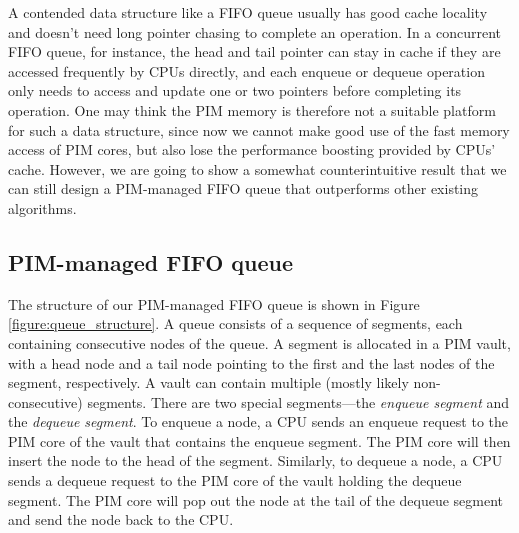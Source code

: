 \documentclass[11pt]{article}
\begin{document}
A contended data structure like a FIFO queue usually has good cache locality
and doesn't need long pointer chasing to complete an operation.
In a concurrent FIFO queue, for instance, the head and tail pointer can stay in
cache if they are accessed frequently by CPUs directly, and each enqueue or dequeue
operation only needs to access and update one or two pointers before completing its operation.
One may think the PIM memory is therefore not a suitable platform for such a data structure,
since now we cannot make good use of the fast memory access of PIM cores, but also
lose the performance boosting provided by CPUs' cache.
However, we are going to show a somewhat counterintuitive result that we can still design
a PIM-managed FIFO queue that outperforms other existing algorithms.

\subsection{PIM-managed FIFO queue}
The structure of our PIM-managed FIFO queue is shown in Figure \ref{figure:queue_structure}.
A queue consists of a sequence of segments, each containing consecutive nodes of the queue.
A segment is allocated in a PIM vault, with a head node and a tail node pointing to the first 
and the last nodes of the segment, respectively.
A vault can contain multiple (mostly likely non-consecutive) segments. 
There are two special segments---the \emph{enqueue segment} and the \emph{dequeue segment}.
To enqueue a node, a CPU sends an enqueue request to the PIM core of the vault
that contains the enqueue segment.
The PIM core will then insert the node to the head of the segment.
Similarly, to dequeue a node, a CPU sends a dequeue request to the PIM core of the vault
holding the dequeue segment. 
The PIM core will pop out the node at the tail of the dequeue segment and 
send the node back to the CPU.
\end{document}
